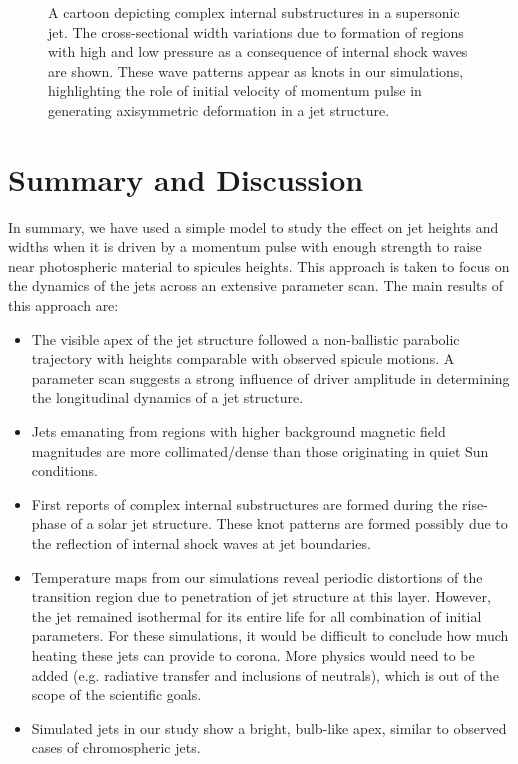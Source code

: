 \documentclass[12pt]{ociamthesis}
\begin{document}
\begin{figure}
\captionsetup[subfigure]{labelformat=empty}
\centering
{}
\caption{A cartoon depicting complex internal substructures in a supersonic jet. The cross-sectional width variations due to formation of regions with high and low pressure as a consequence of internal shock waves are shown. These wave patterns appear as knots in our simulations, highlighting the role of initial velocity of momentum pulse in generating axisymmetric deformation in a jet structure. }
\label{cartoon_jet_waves}
\end{figure}
\section{Summary and Discussion}
\label{sec:c2discussion}
In summary, we have used a simple model to study the effect on jet heights and widths when it is driven by a momentum pulse with enough strength to raise near photospheric material to spicules heights. This approach is taken to focus on the dynamics of the jets across an extensive parameter scan. The main results of this approach are:  
\begin{itemize}
\item{The visible apex of the jet structure followed a non-ballistic parabolic trajectory with heights comparable with observed spicule motions. A parameter scan suggests a strong influence of driver amplitude in determining the longitudinal dynamics of a jet structure.}

\item{Jets emanating from regions with higher background magnetic field magnitudes are more collimated/dense than those originating in quiet Sun conditions.}

\item{First reports of complex internal substructures are formed during the rise-phase of a solar jet structure. These knot patterns are formed possibly due to the reflection of internal shock waves at jet boundaries.}

\item{Temperature maps from our simulations reveal periodic distortions of the transition region due to penetration of jet structure at this layer. However, the jet remained isothermal for its entire life for all combination of initial parameters. For these simulations, it would be difficult to conclude how much heating these jets can provide to corona. More physics would need to be added (e.g. radiative transfer and inclusions of neutrals), which is out of the scope of the scientific goals.}

\item{Simulated jets in our study show a bright, bulb-like apex, similar to observed cases of chromospheric jets.}
\end{itemize}
\end{document}
